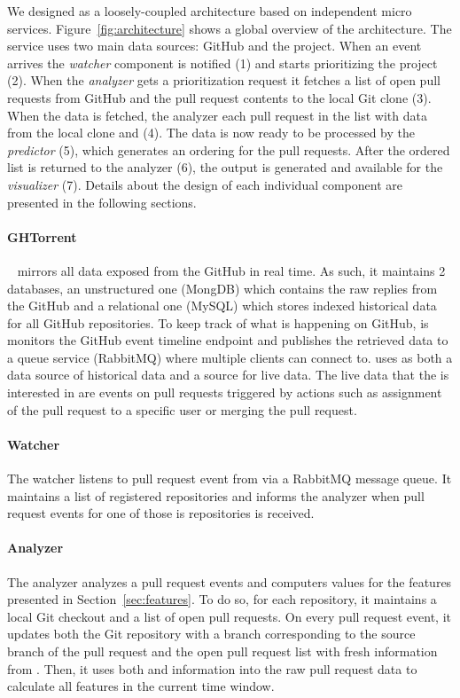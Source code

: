 \documentclass[conference]{IEEEtran}
\begin{document}
We designed \prioritizer as a loosely-coupled architecture based on independent
micro services. Figure~\ref{fig:architecture} shows a global overview of the
architecture.  The \prioritizer service uses two main data sources: GitHub and
the \ghtorrent project.  When an event arrives the \emph{watcher} component is
notified (1) and starts prioritizing the project (2).  When the \emph{analyzer}
gets a prioritization request it fetches a list of open pull requests from
GitHub and the pull request contents to the local Git clone (3).  When the data
is fetched, the analyzer each pull request in the list with data from the local
clone and \ghtorrent (4).  The data is now ready to be processed by the
\emph{predictor} (5), which generates an ordering for the pull requests.  After
the ordered list is returned to the analyzer (6), the output is generated and
available for the \emph{visualizer} (7).  Details about the design of each
individual component are presented in the following sections.

\paragraph{GHTorrent}
\ghtorrent~\cite{G13} mirrors all data exposed from the GitHub \api in
real time. As such, it maintains 2 databases, an unstructured one (MongDB)
which contains the raw replies from the GitHub \api and a relational one
(MySQL) which stores indexed historical data for all GitHub repositories.
To keep track of what is happening on GitHub, is monitors the GitHub event
timeline \api endpoint and publishes the retrieved data to a queue service
(RabbitMQ) where multiple clients can connect to.
\prioritizer uses \ghtorrent as both a data source of historical data and a
source for live data.
The live data that the \prioritizer is interested in are events on pull requests triggered by actions such as assignment of the pull request to a specific
user or merging the pull request.

\paragraph{Watcher}
The watcher listens to pull request event from \ghtorrent
via a RabbitMQ message queue. It maintains a list of registered repositories
and informs the analyzer when pull request events for one of those is
repositories is received.

\paragraph{Analyzer}
The analyzer analyzes a pull request events and computers values for
the features presented in Section~\ref{sec:features}. To do so, for each repository,
it maintains a local Git checkout and a list of open pull requests.
On every pull request event, it updates both the Git repository with
a branch corresponding to the source branch of the pull request
and the open pull request list with fresh information from \ghtorrent.
Then, it uses both \ghtorrent and information into the raw pull request
data to calculate all features in the current time window.
\end{document}
